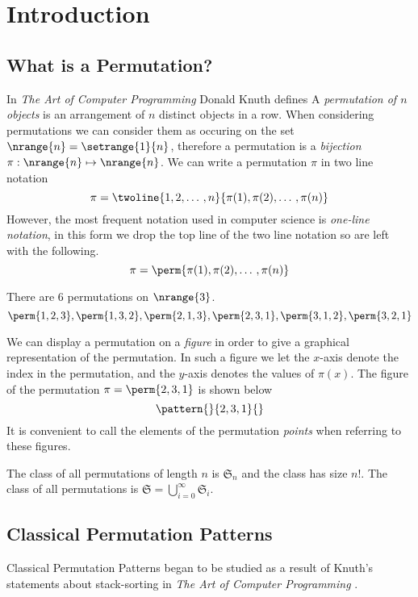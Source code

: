 \chapter{Introduction\label{cha:introduction}}
\section{What is a Permutation?}
In \emph{The Art of Computer Programming}\cite[p.~45]{Knuth:1997:ACP:260999} Donald Knuth defines
A \emph{permutation of \(n\) objects} is an arrangement of \(n\) distinct
objects in a row. When considering permutations we can consider them as
occuring on the set \(\nrange{n} = \setrange{1}{n}\), therefore a permutation
is a \emph{bijection} \(\pi:\nrange{n} \mapsto \nrange{n}\). We can write a
permutation \(\pi\) in two line notation
\begin{equation*}
\pi = \twoline{1,2,\dotso,n}{\pi(1),\pi(2),\dotso,\pi(n)}
\end{equation*}
However, the most frequent notation used in computer science is
\emph{one-line notation}, in this form we drop the top line of the two line
notation so are left with the following.
\begin{equation*}
\pi = \perm{\pi(1),\pi(2),\dotso,\pi(n)}
\end{equation*}

\begin{example}
There are 6 permutations on \(\nrange{3}\).
\begin{equation*}
\perm{1,2,3},\perm{1,3,2},\perm{2,1,3},\perm{2,3,1}, \perm{3,1,2}, \perm{3,2,1}
\end{equation*}
\end{example}

We can display a permutation on a \emph{figure} in order to give a graphical
representation of the permutation. In such a figure we let the \(x\)-axis
denote the index in the permutation, and the \(y\)-axis denotes the values of
\(\pi(x)\). The figure of the permutation \(\pi = \perm{2,3,1}\) is shown below
\begin{equation*}
    \pattern{}{2,3,1}{}
\end{equation*}
It is convenient to call the elements of the permutation \emph{points} when
referring to these figures.

The class of all permutations of length \(n\) is \(\mathfrak{S}_n\) and
the class has size \(n!\). The class of all permutations is
\(\mathfrak{S}=\bigcup_{i=0}^{\infty}\mathfrak{S}_i\).

\section{Classical Permutation Patterns}
Classical Permutation Patterns began to be studied as a result of Knuth's
statements about stack-sorting in \emph{The Art of Computer Programming}
\cite[p.~243, Ex.~5,6]{Knuth:1997:ACP:260999}.

